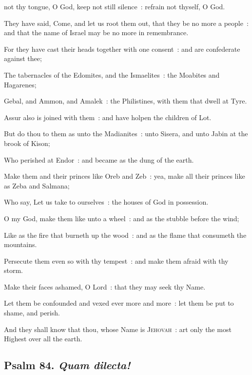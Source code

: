  not thy tongue, O God, keep not still silence~: refrain not thyself, O God.\par
{}
They have said, Come, and let us root them out, that they be no more a people~: and that the name of Israel may be no more in remembrance.\par
{}For they have cast their heads together with one consent~: and are confederate against thee;\par
{}The tabernacles of the Edomites, and the Ismaelites~: the Moabites and Hagarenes;\par
{}Gebal, and Ammon, and Amalek~: the Philistines, with them that dwell at Tyre.\par
{}Assur also is joined with them~: and have holpen the children of Lot.\par
{}But do thou to them as unto the Madianites~: unto Sisera, and unto Jabin at the brook of Kison;\par
{}Who perished at Endor~: and became as the dung of the earth.\par
{}Make them and their princes like Oreb and Zeb~: yea, make all their princes like as Zeba and Salmana;\par
{}Who say, Let us take to ourselves~: the houses of God in possession.\par
{}O my God, make them like unto a wheel~: and as the stubble before the wind;\par
{}Like as the fire that burneth up the wood~: and as the flame that consumeth the mountains.\par
{}Persecute them even so with thy tempest~: and make them afraid with thy storm.\par
{}Make their faces ashamed, O Lord~: that they may seek thy Name.\par
{}Let them be confounded and vexed ever more and more~: let them be put to shame, and perish.\par
{}And they shall know that thou, whose Name is \textsc{Jehovah}~: art only the most Highest over all the earth.\par

\subsection{Psalm 84. \textit{Quam dilecta!}}

